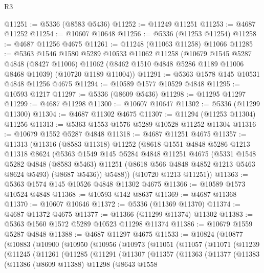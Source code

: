 \begin{lexlean}{R3}
\begin{coremodule}
@11251 := @5336 (@8583 @5436)
@11252 := @11249 @11251
@11253 := @4687 @11252
@11254 := @10607 @10648
@11256 := @5336 (@11253 @11254)
@11258 := @4687 @11256 @4675
@11261 := @11248 (@11063 @11258) @11066
@11285 := @5363
    @1546
    @1580
    @5289
    @10533
    @11062
    @11258
    (@10679
      @1545
      @5287
      @4848
      (@8427 @11006)
      @11062
      (@8462 @1510 @4848 @5286 @1189 @11006 @8468 @11039)
      (@10720 @1189 @11004))
@11291 := @5363 @1578 @145 @10531 @4848 @11256 @4675
@11294 := @10589 @1577 @10529 @4848
@11295 := @10593 @1217
@11297 := @5336 (@8609 @5436)
@11298 := @11295 @11297
@11299 := @4687 @11298
@11300 := @10607 @10647
@11302 := @5336 (@11299 @11300)
@11304 := @4687 @11302 @4675
@11307 := @11294 (@11253 @11304) @11256
@11313 := @5363 @1553 @1576 @5289 @10528 @11252 @11304
@11316 := @10679 @1552 @5287 @4848
@11318 := @4687 @11251 @4675
@11357 := @11313
    (@11316
      (@8583 @11318)
      @11252
      (@8618
        @1551
        @4848
        @5286
        @1213
        @11318
        @8624
        (@5363
          @1549
          @145
          @5284
          @4848
          @11251
          @4675
          (@5331
            @1548
            @5282
            @4848
            (@8583 @5463)
            @11251
            (@8618 @566 @4848 @4852 @1213 @5463 @8624 @5493)
            (@8687 @5436))
          @5488))
      (@10720 @1213 @11251))
@11363 := @5363 @1574 @145 @10526 @4848 @11302 @4675
@11366 := @10589 @1573 @10524 @4848
@11368 := @10593 @142 @8637
@11369 := @4687 @11368
@11370 := @10607 @10646
@11372 := @5336 (@11369 @11370)
@11374 := @4687 @11372 @4675
@11377 := @11366 (@11299 @11374) @11302
@11383 := @5363 @1560 @1572 @5289 @10523 @11298 @11374
@11386 := @10679 @1559 @5287 @4848
@11388 := @4687 @11297 @4675
@11533 := @10824
    (@10877
      (@10883
        (@10900
          (@10950
            (@10956
              (@10973
                (@11051
                  (@11057
                    (@11071
                      (@11239
                        (@11245
                          (@11261
                            (@11285
                              (@11291
                                (@11307
                                  (@11357
                                    (@11363
                                      (@11377
                                        (@11383
                                          (@11386
                                            (@8609 @11388)
                                            @11298
                                            (@8643
                                              @1558

\end{coremodule}
\end{lexlean}
